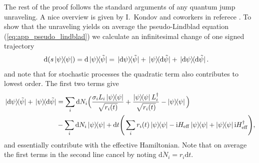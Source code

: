\documentclass[twocolumn,prl,superscriptaddress]{revtex4-2}
\renewcommand{\i}{\mathrm i}
\begin{document}
The rest of the proof follows the standard arguments of any quantum jump unraveling. A nice overview is given by I.\ Kondov and coworkers in referece \cite{IKondovMschreiber2003}. To show that the unraveling yields on average the pseudo-Lindblad equation (\ref{eq:app_pseudo_lindblad}) we calculate an infinitesimal change of one signed trajectory
\begin{align}
	\mathrm d (s \dyad{\psi}) &= \mathrm d \dyad*{\psi}{\tilde\psi} = \dyad*{\mathrm d \psi}{\tilde\psi} + \dyad*{\psi}{\mathrm d \tilde \psi} + \dyad*{\mathrm d \psi}{\mathrm d \tilde \psi}.
\end{align}
and note that for stochastic processes the quadratic term also contributes to lowest order. The first two terms give
\begin{align}
	\begin{split}
		\dyad*{\mathrm d \psi}{\tilde\psi} + \dyad*{\psi}{\mathrm d \tilde \psi} &= \sum_i \mathrm dN_i \Big(\frac{\sigma_i L_i \dyad{\psi}}{\sqrt{ r_i(t)}} + \frac{\dyad{\psi} L_i^\dagger  }{\sqrt{ r_i(t)}} - \dyad{\psi} \Big) \\ & - \sum_i \mathrm dN_i \dyad{\psi} + \mathrm dt \Bigg(\sum_i  r_i(t) \dyad{\psi} - \i H_\mathrm{eff} \dyad{\psi} + \dyad \psi \i H_\mathrm{eff}^\dagger \Bigg) ,
	\end{split}
	\label{eq:app_hermitianterms}
\end{align}
and essentially contribute with the effective Hamiltonian. Note that on average the first terms in the second line cancel by noting $\overline{\mathrm d N_i} = r_i\mathrm d t$.
\end{document}
